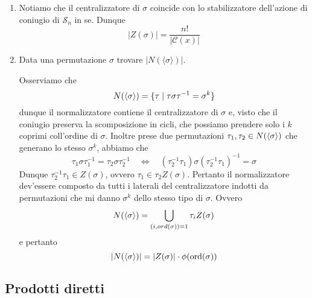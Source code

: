\begin{multicols}{2}
\begin{enumerate}
	\item Notiamo che il centralizzatore di $ \sigma $ coincide con lo stabilizzatore dell'azione di coniugio di $ \mathcal{S}_n $ in se. Dunque
		\[ |Z(\sigma)| = \frac{n!}{|\mathcal{C}(x)|} \]
	
	
	\item Data una permutazione $ \sigma $ trovare $ |N(\langle \sigma \rangle)| $.
	
	Osserviamo che
	\[ N(\langle \sigma \rangle) = \{ \tau \mid \tau\sigma\tau^{-1} = \sigma^k \} \]
	dunque il normalizzatore contiene il centralizzatore di $ \sigma $ e, visto che il coniugio preserva la scomposizione in cicli, che possiamo prendere solo i $ k $ coprimi coll'ordine di $ \sigma $. Inoltre prese due permutazioni $ \tau_1, \tau_2 \in N(\langle \sigma \rangle)$ che generano lo stesso $ \sigma^k $, abbiamo che
	\[ \tau_1 \sigma \tau_1 ^{-1} = \tau_2 \sigma \tau_2 ^{-1} \quad\Leftrightarrow\quad (\tau_2^{-1}\tau_1) \sigma (\tau_2^{-1}\tau_1) ^{-1} = \sigma \]
	Dunque $ \tau_2^{-1}\tau_1 \in Z(\sigma) $, ovvero $ \tau_1 \in \tau_2 Z(\sigma) $. Pertanto il normalizzatore dev'essere composto da tutti i laterali del centralizzatore indotti da permutazioni che mi danno $ \sigma^k $ dello stesso tipo di $ \sigma $.
	Ovvero
	\[ N(\langle \sigma \rangle) = \bigcup_{(i, ord(\sigma))= 1} \tau_i Z(\sigma) \]
	e pertanto
	\[ |N(\langle \sigma \rangle)| = |Z(\sigma)| \cdot \phi(\text{ord}(\sigma)) \]
\end{enumerate}



\end{multicols}
\subsection{Prodotti diretti}

